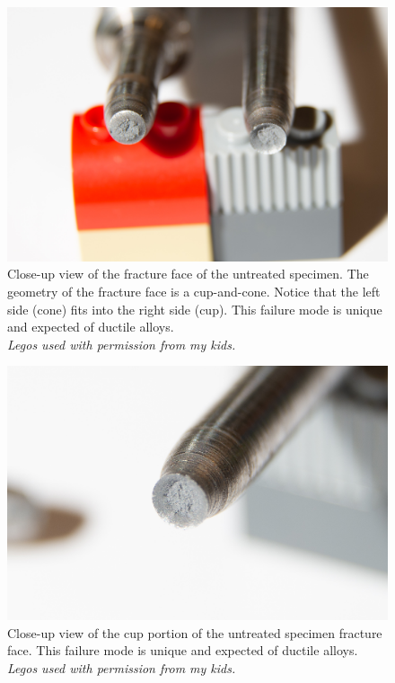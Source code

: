 \documentclass[12pt]{article}
\begin{document}
\begin{figure}[h]
    \centering
    \includegraphics[width=1\textwidth]{ST-5.jpg}
    \caption{Close-up view of the fracture face of the untreated specimen. The geometry of the fracture face is a cup-and-cone. Notice that the left side (cone) fits into the right side (cup). This failure mode is unique and expected of ductile alloys.\\ \textit{Legos used with permission from my kids.}}
    \label{fig:app4}
\end{figure}

\begin{figure}[h]
    \centering
    \includegraphics[width=1\textwidth]{ST-6.jpg}
    \caption{Close-up view of the cup portion of the untreated specimen fracture face. This failure mode is unique and expected of ductile alloys.\\ \textit{Legos used with permission from my kids.}}
    \label{fig:app5}
\end{figure}
    
\end{document}
